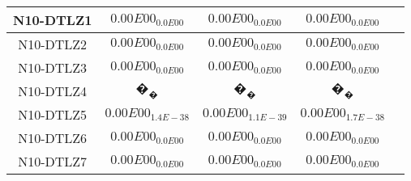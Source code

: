 \documentclass{article}
\begin{document}
\begin{table*}[ht!]
\begin{tabular}{|c||c||c||c||c|}
\hline
N10-DTLZ1 &\cellcolor{gray95}$0.00E00_{0.0E00}$ &\cellcolor{gray25}$0.00E00_{0.0E00}$ &$0.00E00_{0.0E00}$\\ 
\hline
N10-DTLZ2 &\cellcolor{gray95}$0.00E00_{0.0E00}$ &\cellcolor{gray25}$0.00E00_{0.0E00}$ &$0.00E00_{0.0E00}$\\ 
\hline
N10-DTLZ3 &\cellcolor{gray95}$0.00E00_{0.0E00}$ &\cellcolor{gray25}$0.00E00_{0.0E00}$ &$0.00E00_{0.0E00}$\\ 
\hline
N10-DTLZ4 &\cellcolor{gray25}$�_{�}$ &$�_{�}$ &$�_{�}$\\ 
\hline
N10-DTLZ5 &\cellcolor{gray25}$0.00E00_{1.4E-38}$ &\cellcolor{gray95}$0.00E00_{1.1E-39}$ &$0.00E00_{1.7E-38}$\\ 
\hline
N10-DTLZ6 &\cellcolor{gray95}$0.00E00_{0.0E00}$ &\cellcolor{gray25}$0.00E00_{0.0E00}$ &$0.00E00_{0.0E00}$\\ 
\hline
N10-DTLZ7 &\cellcolor{gray95}$0.00E00_{0.0E00}$ &\cellcolor{gray25}$0.00E00_{0.0E00}$ &$0.00E00_{0.0E00}$\\ 
\hline
\end{tabular}
\end{table*}
\end{document}
